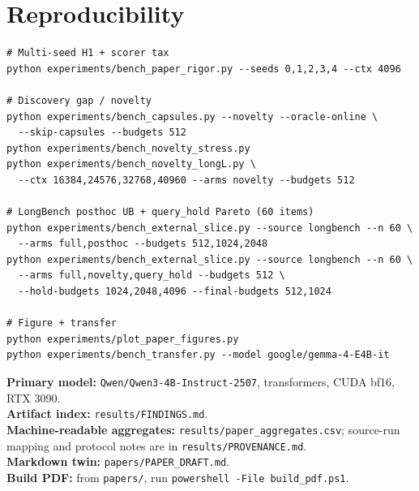 \documentclass[11pt,a4paper]{article}
\begin{document}
\section*{Reproducibility}

{\small
\begin{verbatim}
# Multi-seed H1 + scorer tax
python experiments/bench_paper_rigor.py --seeds 0,1,2,3,4 --ctx 4096

# Discovery gap / novelty
python experiments/bench_capsules.py --novelty --oracle-online \
  --skip-capsules --budgets 512
python experiments/bench_novelty_stress.py
python experiments/bench_novelty_longL.py \
  --ctx 16384,24576,32768,40960 --arms novelty --budgets 512

# LongBench posthoc UB + query_hold Pareto (60 items)
python experiments/bench_external_slice.py --source longbench --n 60 \
  --arms full,posthoc --budgets 512,1024,2048
python experiments/bench_external_slice.py --source longbench --n 60 \
  --arms full,novelty,query_hold --budgets 512 \
  --hold-budgets 1024,2048,4096 --final-budgets 512,1024

# Figure + transfer
python experiments/plot_paper_figures.py
python experiments/bench_transfer.py --model google/gemma-4-E4B-it
\end{verbatim}
}

\noindent
\textbf{Primary model:} \texttt{Qwen/Qwen3-4B-Instruct-2507}, transformers, CUDA bf16, RTX 3090.\\
\textbf{Artifact index:} \texttt{results/FINDINGS.md}.\\
\textbf{Machine-readable aggregates:} \texttt{results/paper\_aggregates.csv}; source-run mapping and protocol notes are in \texttt{results/PROVENANCE.md}.\\
\textbf{Markdown twin:} \texttt{papers/PAPER\_DRAFT.md}.\\
\textbf{Build PDF:} from \texttt{papers/}, run \texttt{powershell -File build\_pdf.ps1}.
\end{document}
